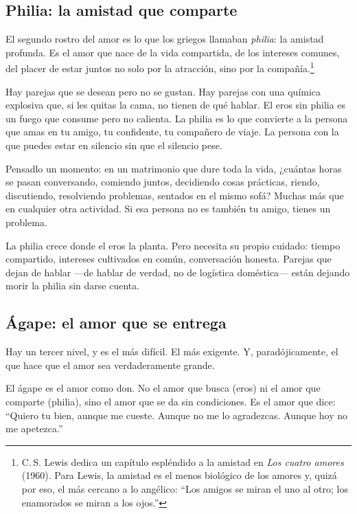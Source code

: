 \subsection*{Philia: la amistad que comparte}

El segundo rostro del amor es lo que los griegos llamaban \textit{philia}: la amistad profunda. Es el amor que nace de la vida compartida, de los intereses comunes, del placer de estar juntos no solo por la atracción, sino por la compañía.\footnote{C.\,S. Lewis dedica un capítulo espléndido a la amistad en \textit{Los cuatro amores} (1960). Para Lewis, la amistad es el menos biológico de los amores y, quizá por eso, el más cercano a lo angélico: ``Los amigos se miran el uno al otro; los enamorados se miran a los ojos.''}

Hay parejas que se desean pero no se gustan. Hay parejas con una química explosiva que, si les quitas la cama, no tienen de qué hablar. El eros sin philia es un fuego que consume pero no calienta. La philia es lo que convierte a la persona que amas en tu amigo, tu confidente, tu compañero de viaje. La persona con la que puedes estar en silencio sin que el silencio pese.

Pensadlo un momento: en un matrimonio que dure toda la vida, ¿cuántas horas se pasan conversando, comiendo juntos, decidiendo cosas prácticas, riendo, discutiendo, resolviendo problemas, sentados en el mismo sofá? Muchas más que en cualquier otra actividad. Si esa persona no es también tu amigo, tienes un problema.

La philia crece donde el eros la planta. Pero necesita su propio cuidado: tiempo compartido, intereses cultivados en común, conversación honesta. Parejas que dejan de hablar ---de hablar de verdad, no de logística doméstica--- están dejando morir la philia sin darse cuenta.

\subsection*{Ágape: el amor que se entrega}

Hay un tercer nivel, y es el más difícil. El más exigente. Y, paradójicamente, el que hace que el amor sea verdaderamente grande.

El ágape es el amor como don. No el amor que busca (eros) ni el amor que comparte (philia), sino el amor que se da sin condiciones. Es el amor que dice: ``Quiero tu bien, aunque me cueste. Aunque no me lo agradezcas. Aunque hoy no me apetezca.''

